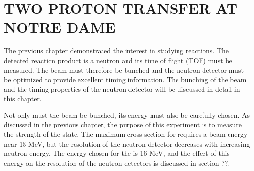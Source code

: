 %
%
%
%
%
%
%
%

%
%

\chapter{TWO PROTON TRANSFER AT NOTRE DAME}
\label{chap:2pExpt}

The previous chapter demonstrated the interest in studying \reaction reactions.  The detected reaction product is a neutron and its time of flight (TOF) must be measured.  The beam must therefore be bunched and the neutron detector must be optimized to provide excellent timing information.  The bunching of the beam and the timing properties of the neutron detector will be discussed in detail in this chapter.   


Not only must the beam be bunched, its energy must also be carefully chosen.  As discussed in the previous chapter, the purpose of this experiment is to measure the strength of the \zp state.  The maximum \zp cross-section for \reaction requires a beam energy near 18 MeV, but the resolution of the neutron detector decreases with increasing neutron energy.  The energy chosen for the  is 16 MeV, and the effect of this energy on the resolution of the neutron detectors is discussed in section ??.


